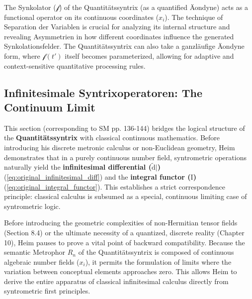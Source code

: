 \documentclass[12pt]{article}
\newcommand{\funktionaloperator}{\mathcal{f}}
\begin{document}
The Synkolator (\(\funktionaloperator\)) of the Quantitätssyntrix (as a quantified Äondyne) acts as a functional operator on its continuous coordinates (\(x_i\)). The technique of Separation der Variablen is crucial for analyzing its internal structure and revealing Asymmetrien in how different coordinates influence the generated Synkolationsfelder. The Quantitätssyntrix can also take a ganzläufige Äondyne form, where \(\funktionaloperator(t')\) itself becomes parameterized, allowing for adaptive and context-sensitive quantitative processing rules.

\subsection{Infinitesimale Syntrixoperatoren: The Continuum Limit}
\label{sec:infinitesimal_operators}

This section (corresponding to SM pp. 136-144) bridges the logical structure of the \textbf{Quantitätssyntrix} with classical continuous mathematics. Before introducing his discrete metronic calculus or non-Euclidean geometry, Heim demonstrates that in a purely continuous number field, syntrometric operations naturally yield the \textbf{infinitesimal differential (\(\tilde{\mathrm{d}}|\))} (\eqref{eq:original_infinitesimal_diff}) and the \textbf{integral functor (\(\mathrm{I}\))} (\eqref{eq:original_integral_functor}). This establishes a strict correspondence principle: classical calculus is subsumed as a special, continuous limiting case of syntrometric logic.

Before introducing the geometric complexities of non-Hermitian tensor fields (Section 8.4) or the ultimate necessity of a quantized, discrete reality (Chapter 10), Heim pauses to prove a vital point of backward compatibility. Because the semantic Metrophor \( R_n \) of the Quantitätssyntrix is composed of continuous algebraic number fields (\(x_i\)), it permits the formulation of limits where the variation between conceptual elements approaches zero. This allows Heim to derive the entire apparatus of classical infinitesimal calculus directly from syntrometric first principles.
\end{document}
